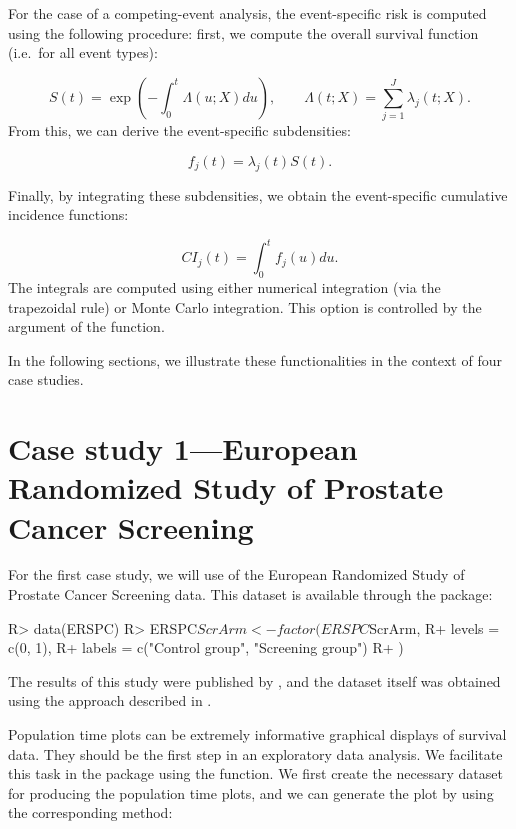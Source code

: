 \documentclass[
]{jss}
\begin{document}
For the case of a competing-event analysis, the event-specific risk is
computed using the following procedure: first, we compute the overall
survival function (i.e.~for all event types):

\[ S(t) = \exp\left(-\int_0^t \Lambda(u;X) du\right),\qquad \Lambda(t;X) = \sum_{j=1}^J \lambda_j(t;X).\]
From this, we can derive the event-specific subdensities:

\[ f_j(t) = \lambda_j(t)S(t).\]

Finally, by integrating these subdensities, we obtain the event-specific
cumulative incidence functions:

\[ CI_j(t) = \int_0^t f_j(u)du.\] The integrals are computed using
either numerical integration (via the trapezoidal rule) or Monte Carlo
integration. This option is controlled by the argument  of
the  function.

In the following sections, we illustrate these functionalities in the
context of four case studies.

\hypertarget{case-study-1european-randomized-study-of-prostate-cancer-screening}{%
\section{Case study 1---European Randomized Study of Prostate Cancer
Screening}\label{case-study-1european-randomized-study-of-prostate-cancer-screening}}

For the first case study, we will use of the European Randomized Study
of Prostate Cancer Screening data. This dataset is available through the
 package:

\begin{CodeChunk}

\begin{CodeInput}
R> data(ERSPC)
R> ERSPC$ScrArm <- factor(ERSPC$ScrArm,
R+   levels = c(0, 1),
R+   labels = c("Control group", "Screening group")
R+ )
\end{CodeInput}
\end{CodeChunk}

The results of this study were published by
\citep{schroder2009screening}, and the dataset itself was obtained using
the approach described in \citep{liu2014recovering}.

Population time plots can be extremely informative graphical displays of
survival data. They should be the first step in an exploratory data
analysis. We facilitate this task in the  package using
the  function. We first create the necessary dataset for
producing the population time plots, and we can generate the plot by
using the corresponding  method:
\end{document}
